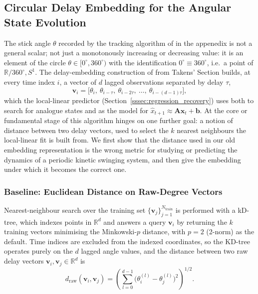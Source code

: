 \documentclass[letterpaper, 10pt, conference]{IEEEtran}
\begin{document}
\subsection{\textbf{Circular Delay Embedding for the Angular State Evolution}}
\label{ssec:circular_embedding}

    The stick angle $\theta$ recorded by the tracking algorithm of in the appenedix is not a general scalar; not just a monotonously increasing or decreasing
    value: it is an element of the circle $\theta \in [0^{\circ},360^{\circ})$
    with the identification $0^{\circ}\equiv 360^{\circ}$, i.e.\ a point of
    $\mathbb{R}/360^{\circ}, S^1$. %
    The delay-embedding construction
    of from Takens' Section %
    builds, at every time index $i$, a vector of
    $d$ lagged observations separated by delay $\tau$,
    \begin{equation}
        \mathbf{v}_i = \bigl[\theta_i,\ \theta_{i-\tau},\ \theta_{i-2\tau},\ \dots,\ \theta_{i-(d-1)\tau}\bigr],
        \label{eq:raw_delay_vector}
    \end{equation}
    which the local-linear predictor (Section~\ref{sssec:regression_recovery}) uses both to
    search for analogue states and as the model for
    $\widehat{x}_{t+1}\approx\mathbf{A}\mathbf{x}_t+\mathbf{b}$. At the core or fundamental stage of this algorithm hinges on one further goal: a notion of distance between two
    delay vectors, used to select the $k$ nearest neighbours the local-linear
    fit is built from. We first show that the distance used in our old
    embedding representation is the wrong metric for studying or predicting the dynamics of a periodic kinetic swinging system, and then give the
    embedding under which it becomes the correct one. \\

    \subsubsection{Baseline: Euclidean Distance on Raw-Degree Vectors}
    \label{sssec:raw_distance}

        Nearest-neighbour search over the training set
        $\{\mathbf{v}_j\}_{j=1}^{N_{\mathrm{train}}}$ is performed with a
        kD-tree,  %
        which indexes points in $\mathbb{R}^d$ and answers a query $\mathbf{v}_i$ by returning the
        $k$ training vectors minimising the Minkowski-$p$ distance, with
        $p=2$ (2-norm) as the default. Time indices are excluded from the indexed
        coordinates, so the KD-tree operates purely on the $d$ lagged
        angle values, and the distance between two raw delay vectors
        $\mathbf{v}_i,\mathbf{v}_j\in\mathbb{R}^d$ is
        \begin{equation}
            d_{\mathrm{raw}}(\mathbf{v}_i,\mathbf{v}_j)
                = \left(\sum_{l=0}^{d-1}\bigl(\theta_i^{(l)}-\theta_j^{(l)}\bigr)^2\right)^{\!1/2}.
            \label{eq:raw_distance}
        \end{equation}
\end{document}
